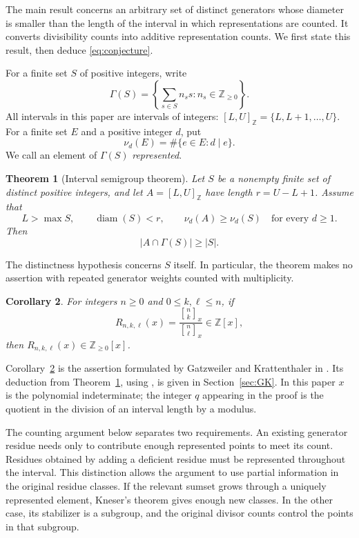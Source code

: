 \documentclass[11pt]{article}
\newtheorem{theorem}{Theorem}[section]
\newtheorem{corollary}[theorem]{Corollary}
\theoremstyle{definition}
\theoremstyle{remark}
\newcommand{\NN}{\mathbb Z_{\geq 0}}
\newcommand{\ZZ}{\mathbb Z}
\DeclareMathOperator{\diam}{diam}
\newcommand{\iv}[2]{[#1,#2]_{\ZZ}}
\newcommand{\Ga}{\Gamma}
\newcommand{\qbinom}[2]{\genfrac{[}{]}{0pt}{}{#1}{#2}}
\begin{document}
The main result concerns an arbitrary set of distinct generators whose
diameter is smaller than the length of the interval in which representations
are counted. It converts divisibility counts into additive representation
counts. We first state this result, then deduce \eqref{eq:conjecture}.

For a finite set $S$ of positive integers, write
\[
 \Ga(S)=\left\{\sum_{s\in S}n_s s:n_s\in\NN\right\}.
\]
All intervals in this paper are intervals of integers:
$\iv{L}{U}=\{L,L+1,\ldots,U\}$. For a finite set $E$ and a positive
integer $d$, put
\[
 \nu_d(E)=\#\{e\in E:d\mid e\}.
\]
We call an element of $\Ga(S)$ \emph{represented}.

\begin{theorem}[Interval semigroup theorem]\label{thm:interval}
Let $S$ be a nonempty finite set of distinct positive integers, and let
$A=\iv{L}{U}$ have length $r=U-L+1$. Assume that
\begin{equation}\label{eq:admissible}
 L>\max S,\qquad \diam(S)<r,\qquad
 \nu_d(A)\geq\nu_d(S)\quad\text{for every }d\geq1.
\end{equation}
Then
\[
 |A\cap\Ga(S)|\geq |S|.
\]
\end{theorem}

The distinctness hypothesis concerns $S$ itself. In particular, the
theorem makes no assertion with repeated generator weights counted
with multiplicity.

\begin{corollary}\label{cor:GK}
For integers $n\geq0$ and $0\leq k,\ell\leq n$, if
\[
 R_{n,k,\ell}(x)=\frac{\qbinom{n}{k}_x}{\qbinom{n}{\ell}_x}
 \in\ZZ[x],
\]
then $R_{n,k,\ell}(x)\in\ZZ_{\geq0}[x]$.
\end{corollary}

Corollary~\ref{cor:GK} is the assertion formulated by Gatzweiler and
Krattenthaler in \cite[Conjecture~1]{GK}. Its deduction from
Theorem~\ref{thm:interval}, using \cite[Propositions~3.3 and~3.6]{GLY},
is given in Section~\ref{sec:GK}. In this paper $x$ is the polynomial
indeterminate; the integer $q$ appearing in the proof is the quotient
in the division of an interval length by a modulus.

The counting argument below separates two requirements. An existing
generator residue needs only to contribute enough represented points
to meet its count. Residues obtained by adding a deficient residue
must be represented throughout the interval. This distinction allows
the argument to use partial information in the original residue classes.
If the relevant sumset grows through a uniquely represented element,
Kneser's theorem gives enough new classes. In the other case, its
stabilizer is a subgroup, and the original divisor counts control the
points in that subgroup.
\end{document}

